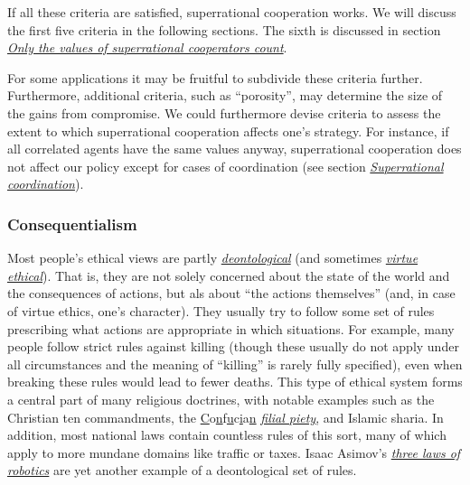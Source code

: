 If all these criteria are satisfied, superrational cooperation works. We
will discuss the first five criteria in the following sections. The
sixth is discussed in section
\protect\hyperlink{only-helping-superrational-cooperators-helps-you-superrationally}{\emph{Only
the values of superrational cooperators count}}.

For some applications it may be fruitful to subdivide these criteria
further. Furthermore, additional criteria, such as
\parencite{Bostrom2014-gy} ``porosity'', may determine the
size of the gains from compromise. We could furthermore devise criteria
to assess the extent to which superrational cooperation affects one's
strategy. For instance, if all correlated agents have the same values
anyway, superrational cooperation does not affect our policy except for
cases of coordination (see section
\protect\hyperlink{notes-on-superrational-coordination}{\emph{Superrational
coordination}}).

\hypertarget{consequentialism}{\subsubsection{Consequentialism}\label{consequentialism}}

Most people's ethical views are partly
\href{https://en.wikipedia.org/wiki/Deontological_ethics}{\emph{\emph{deontological}}}
(and sometimes
\href{https://en.wikipedia.org/wiki/Virtue_ethics}{\emph{\emph{virtue
ethical}}}). That is, they are not solely concerned about the state of
the world and the consequences of actions, but als about ``the actions
themselves'' (and, in case of virtue ethics, one's character). They
usually try to follow some set of rules prescribing what actions are
appropriate in which situations. For example, many people follow strict
rules against killing (though these usually do not apply under all
circumstances and the meaning of ``killing'' is rarely fully specified),
even when breaking these rules would lead to fewer deaths. This type of
ethical system forms a central part of many religious doctrines, with
notable examples such as the Christian ten commandments, the
\href{https://en.wikipedia.org/wiki/Ten_Commandments}{C}o\href{https://en.wikipedia.org/wiki/Ten_Commandments}{n}f\href{https://en.wikipedia.org/wiki/Ten_Commandments}{u}c\href{https://en.wikipedia.org/wiki/Ten_Commandments}{i}a\href{https://en.wikipedia.org/wiki/Ten_Commandments}{n}
\href{https://en.wikipedia.org/wiki/Filial_piety}{\emph{filial
piety}}\href{https://en.wikipedia.org/wiki/Ten_Commandments}{,} and
Islamic sharia. In addition, most national laws contain countless rules
of this sort, many of which apply to more mundane domains like traffic
or taxes. Isaac Asimov's
\href{https://en.wikipedia.org/wiki/Three_Laws_of_Robotics}{\emph{three
laws of robotics}} are yet another example of a deontological set of
rules.

